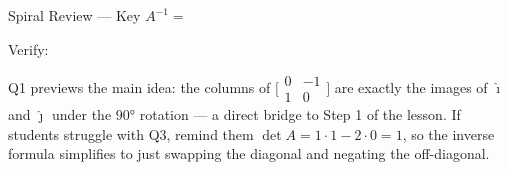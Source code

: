 \documentclass[10pt]{article}
\begin{document}
\begin{notesbox}{Spiral Review --- Key}
\vspace{0.1in}
\hspace{1em} $A^{-1} = $ 

\vspace{0.06in}
\hspace{1em} Verify: 

\end{notesbox}

\begin{teachernote}
Q1 previews the main idea: the columns of $\bigl[\begin{smallmatrix}0&-1\\1&0\end{smallmatrix}\bigr]$
are exactly the images of $\hat{\imath}$ and $\hat{\jmath}$ under the $90°$ rotation --- a direct
bridge to Step 1 of the lesson. If students struggle with Q3, remind them $\det A = 1\cdot1 - 2\cdot0 = 1$,
so the inverse formula simplifies to just swapping the diagonal and negating the off-diagonal.
\end{teachernote}
\end{document}
